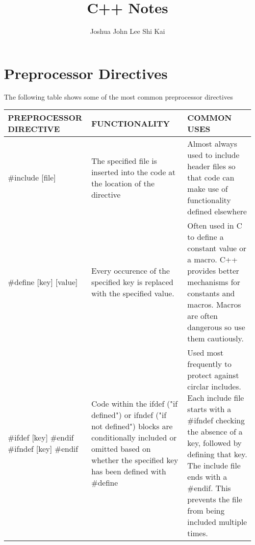\documentclass{article}
\title{C++ Notes}
\author{Joshua John Lee Shi Kai}
\begin{document}
\maketitle
\tableofcontents

\newpage
\section{Preprocessor Directives}
The following table shows some of the most common preprocessor directives
\begin{center}
	\begin{tabularx}{\textwidth}{
			| >{\raggedright\arraybackslash}X
			| >{\raggedright\arraybackslash}X
			| >{\raggedright\arraybackslash}X |
		}
		\hline
		\textbf{PREPROCESSOR DIRECTIVE} & \textbf{FUNCTIONALITY}                                                                                                                                                           & \textbf{COMMON USES}                                                                                                                                                                                                                                              \\
		\hline
		\#include [file]                & The specified file is inserted into the code at the location of the directive                                                                                                    & Almost always used to include header files so that code can make use of functionality defined elsewhere                                                                                                                                                           \\
		\hline
		\#define [key] [value]          & Every occurence of the specified key is replaced with the specified value.                                                                                                       & Often used in C to define a constant value or a macro. C++ provides better mechanisms for constants and macros. Macros are often dangerous so use them cautiously.                                                                                                \\
		\hline
		\#ifdef [key] \newline
		\#endif \newline
		\#ifndef [key] \newline
		\#endif                         & Code within the ifdef ("if defined") or ifndef ("if not defined") blocks are conditionally included or omitted based on whether the specified key has been defined with \#define & Used most frequently to protect against circlar includes. Each include file starts with a \#ifndef checking the absence of a key, followed by defining that key. The include file ends with a \#endif. This prevents the file from being included multiple times. \\

\end{tabularx}
\end{center}
\end{document}
